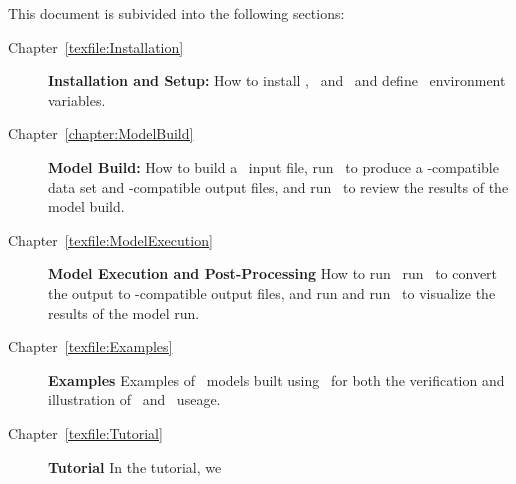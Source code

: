This document is subivided into the following sections:
\begin{description}
    \item[Chapter~\ref{texfile:Installation}]\textbf{Installation and Setup:} How to install \mut, \mfus\ and \tecplot\ and define \windows\ environment variables.
     \item[Chapter~\ref{chapter:ModelBuild}]\textbf{Model Build:} How to build a \mut\ input file, run \mut\ to produce a \mfus-compatible data set and \tecplot-compatible output files, and run \tecplot\ to review the results of the model build.
    \item[Chapter~\ref{texfile:ModelExecution}]\textbf{Model Execution and Post-Processing} How to run \mfus\, run \mut\ to convert the output to \tecplot-compatible output files, and run and run \tecplot\ to visualize the results of the model run.
    \item[Chapter~\ref{texfile:Examples}]\textbf{Examples} Examples of \mfus\ models built using \mut\ for both the verification and illustration of \mut\ and \mfus\ useage.
    \item[Chapter~\ref{texfile:Tutorial}]\textbf{Tutorial} In the tutorial, we
\end{description} 